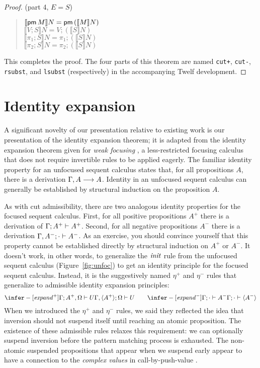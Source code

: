 \documentclass[acmtocl]{robtrans}\pdfoutput=1
\newcommand{\seq}[2]{{#1} \longrightarrow {#2} \mathstrut}
\newcommand{\susp}[1]{\langle{#1}\rangle}
\newcommand{\ifoc}[3]{{#1}; {#2} \vdash {#3} \mathstrut}
\newcommand{\llangle}{\llbracket}
\newcommand{\rrangle}{\rrbracket}
\begin{document}
\begin{proof}
\medskip
\fbox{$\llangle S \rrangle^{A^+} N = S'$} (part 4, $E = S$)
\begin{quote}
$\llangle \uslt{M} \rrangle N
   = \uslt{(\llangle M \rrangle N)}$\\
$\llangle V; S \rrangle N
   = V; (\llangle S \rrangle N)$\\
$\llangle \pi_1; S \rrangle N
   = \pi_1; (\llangle S \rrangle N)$\\
$\llangle \pi_2; S \rrangle N
   = \pi_2; (\llangle S \rrangle N)$
\end{quote}

\noindent
This completes the proof. The four parts of this theorem are named
{\tt cut+}, {\tt cut-}, {\tt rsubst}, and {\tt lsubst} (respectively)
in the accompanying Twelf development.
\end{proof}



\section{Identity expansion}
\label{sec:expansion}

A significant novelty of our presentation relative to existing work is
our presentation of the identity expansion theorem; it is adapted from
the identity expansion theorem given for {\it weak focusing}
\cite{simmons11weak}, a less-restricted focusing calculus that does
not require invertible rules to be applied eagerly. The familiar
identity property for an unfocused sequent calculus states that, for
all propositions $A$, there is a derivation $\seq{\Gamma,
  A}{A}$. Identity in an unfocused sequent calculus can generally be
established by structural induction on the proposition $A$.


As with cut admissibility, there are two analogous identity properties
for the focused sequent calculus. First, for all positive propositions
$A^+$ there is a derivation of $\ifoc{\Gamma}{A^+}{A^+}$. Second, for
all negative propositions $A^-$ there is a derivation $\ifoc{\Gamma,
  A^-}{\cdot}{A^-}$. As an exercise, you should convince yourself that
this property cannot be established directly by structural induction
on $A^+$ or $A^-$. It doesn't work, in other words, to generalize the
${\it init}$ rule from the unfocused sequent calculus
(Figure~\ref{fig:unfoc}) to get an identity principle for the focused
sequent calculus. Instead, it is the suggestively named $\eta^+$ and
$\eta^-$ rules that generalize to admissible identity expansion
principles:
\[
\infer-[{\it expand}^+]
{\ifoc{\Gamma}{A^+, \Omega}{U}}
{\ifoc{\Gamma, \susp{A^+}}{\Omega}{U}}
\qquad
\infer-[{\it expand}^-]
{\ifoc{\Gamma}{\cdot}{A^-}}
{\ifoc{\Gamma}{\cdot}{\susp{A^-}}}
\]
When we introduced the $\eta^+$ and $\eta^-$ rules, we said they
reflected the idea that inversion should not suspend itself until
reaching an atomic proposition. The existence of these admissible
rules relaxes this requirement: we can optionally suspend inversion
before the pattern matching process is exhausted. The non-atomic
suspended propositions that appear when we suspend early appear to
have a connection to the {\it complex values} in call-by-push-value
\cite{levy04call}.
\end{document}
